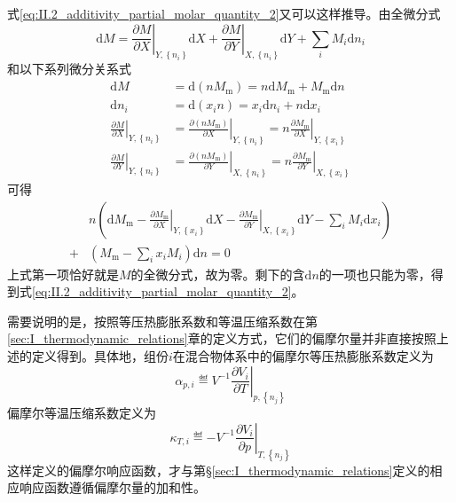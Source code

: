 \documentclass[main.tex]{subfiles}
\begin{document}
式\eqref{eq:II.2_additivity_partial_molar_quantity_2}又可以这样推导。由全微分式
\[\mathrm{d}M=\left.\frac{\partial M}{\partial X}\right|_{Y,\left\{n_i\right\}}\mathrm{d}X+\left.\frac{\partial M}{\partial Y}\right|_{X,\left\{n_i\right\}}\mathrm{d}Y+\sum_i M_i\mathrm{d}n_i\]
和以下系列微分关系式
\begin{align*}
    \mathrm{d}M                                                       & =\mathrm{d}\left(nM_\text{m}\right)=n\mathrm{d}M_\text{m}+M_\text{m}\mathrm{d}n                                                                                       \\
    \mathrm{d}n_i                                                     & =\mathrm{d}\left(x_i n\right)=x_i\mathrm{d}n_i+n\mathrm{d}x_i                                                                                                         \\
    \left.\frac{\partial M}{\partial X}\right|_{Y,\left\{n_i\right\}} & =\left.\frac{\partial \left(nM_\text{m}\right)}{\partial X}\right|_{Y,\left\{n_i\right\}}=n\left.\frac{\partial M_\text{m}}{\partial X}\right|_{Y,\left\{x_i\right\}} \\
    \left.\frac{\partial M}{\partial Y}\right|_{Y,\left\{n_i\right\}} & =\left.\frac{\partial\left(nM_\text{m}\right)}{\partial Y}\right|_{X,\left\{n_i\right\}}=n\left.\frac{\partial M_\text{m}}{\partial Y}\right|_{X,\left\{x_i\right\}}
\end{align*}
可得
\begin{align*}
      & n\left(\mathrm{d}M_\text{m}-\left.\frac{\partial M_\text{m}}{\partial X}\right|_{Y,\left\{x_i\right\}}\mathrm{d}X-\left.\frac{\partial M_\text{m}}{\partial Y}\right|_{X,\left\{x_i\right\}}\mathrm{d}Y-\sum_iM_i\mathrm{d}x_i\right) \\
    + & \left(M_\text{m}-\sum_ix_iM_i\right)\mathrm{d}n=0
\end{align*}
上式第一项恰好就是$M$的全微分式，故为零。剩下的含$\mathrm{d}n$的一项也只能为零，得到式\eqref{eq:II.2_additivity_partial_molar_quantity_2}。

需要说明的是，按照等压热膨胀系数和等温压缩系数在第\ref{sec:I_thermodynamic_relations}章的定义方式，它们的偏摩尔量并非直接按照上述的定义得到。具体地，组份$i$在混合物体系中的偏摩尔等压热膨胀系数定义为
\[\alpha_{p,i}\eqdef V^{-1}\left.\frac{\partial V_i}{\partial T}\right|_{p,\left\{n_j\right\}}\]
偏摩尔等温压缩系数定义为
\[\kappa_{T,i}\eqdef -V^{-1}\left.\frac{\partial V_i}{\partial p}\right|_{T,\left\{n_j\right\}}\]
这样定义的偏摩尔响应函数，才与第\S\ref{sec:I_thermodynamic_relations}定义的相应响应函数遵循偏摩尔量的加和性。
\end{document}
